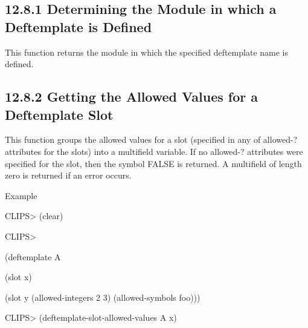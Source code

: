 \documentclass[letterpaper,10pt,english]{sphinxmanual}
\begin{document}
\subsection{12.8.1 Determining the Module in which a Deftemplate is Defined}
\label{\detokenize{actions:determining-the-module-in-which-a-deftemplate-is-defined}}
This function returns the module in which the specified deftemplate name
is defined.


\begin{sphinxVerbatim}[commandchars=\\\{\}]
 
\end{sphinxVerbatim}


\subsection{12.8.2 Getting the Allowed Values for a Deftemplate Slot}
\label{\detokenize{actions:getting-the-allowed-values-for-a-deftemplate-slot}}
This function groups the allowed values for a slot (specified in any of
allowed-? attributes for the slots) into a multifield variable. If no
allowed-? attributes were specified for the slot, then the symbol FALSE
is returned. A multifield of length zero is returned if an error occurs.


\begin{sphinxVerbatim}[commandchars=\\\{\}]
  
\end{sphinxVerbatim}

Example

CLIPS\textgreater{} (clear)

CLIPS\textgreater{}

(deftemplate A

(slot x)

(slot y (allowed-integers 2 3) (allowed-symbols foo)))

CLIPS\textgreater{} (deftemplate-slot-allowed-values A x)
\end{document}
